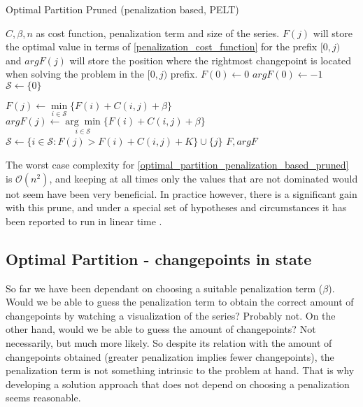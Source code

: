 \documentclass[pdflatex,sn-mathphys]{sn-jnl}%
\theoremstyle{thmstyleone}%
\theoremstyle{thmstyletwo}%
\theoremstyle{thmstylethree}%
\begin{document}
\begin{algorithm}[H]
\caption{Optimal Partition Pruned (penalization based, PELT)}\label{optimal_partition_penalization_based_pruned}
\begin{algorithmic}[1]
\Require $C, \beta, n$ as cost function, penalization term and size of the series. 
\Ensure $F(j)$ will store the optimal value in terms of \ref{penalization_cost_function} for the prefix $[0,j)$ and $argF(j)$ will store the position where the rightmost changepoint is located when solving the problem in the $[0,j)$ prefix. 
\State $F(0) \leftarrow 0$
\State $argF(0) \leftarrow -1$
\State $\mathcal{S} \leftarrow \{0 \}$ 

 
  \State $F(j) \leftarrow \underset{i \in \mathcal{S}}{\min} \{ F(i) + C(i,j) + \beta \}$ 
  \State $argF(j)\leftarrow \underset{i \in \mathcal{S}}{\arg \min} \{ F(i) + C(i,j) + \beta \}$ 
  \State $\mathcal{S} \leftarrow \{i \in \mathcal{S} : F(j) > F(i) + C(i,j) + K \} \cup \{j\}$ 
\EndFor
\State \Return $F, argF$
\end{algorithmic}
\end{algorithm}

The worst case complexity for \ref{optimal_partition_penalization_based_pruned} is $\mathcal{O}(n^2)$, and keeping at all times only the values that are not dominated would not seem have been very beneficial. In practice however, there is a significant gain with this prune, and under a special set of hypotheses and circumstances it has been reported to run in linear time \citep{killick}.


\subsection{Optimal Partition - changepoints in state}\label{changepoints_in_state}

So far we have been dependant on choosing a suitable penalization term ($\beta$). Would we be able to guess the penalization term to obtain the correct amount of changepoints by watching a visualization of the series? Probably not. On the other hand, would we be able to guess the amount of changepoints? Not necessarily, but much more likely. So despite its relation with the amount of changepoints obtained (greater penalization implies fewer changepoints), the penalization term is not something intrinsic to the problem at hand. That is why developing a solution approach that does not depend on choosing a penalization seems reasonable.
\end{document}
